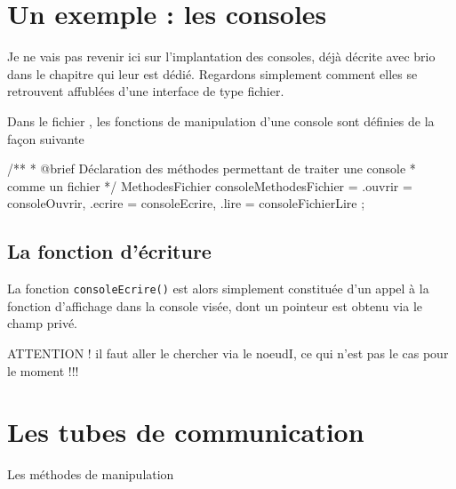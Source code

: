 %
\section{Un exemple : les consoles}

   Je ne vais pas revenir ici sur l'implantation des consoles, déjà
décrite avec brio dans le chapitre qui leur est dédié. Regardons
simplement comment elles se retrouvent affublées d'une interface de
type fichier.

   Dans le fichier , les fonctions de
manipulation d'une console sont définies de la façon suivante

\begin{lstinline}
/**
 * @brief Déclaration des méthodes permettant de traiter une console
 * comme un fichier
 */
MethodesFichier consoleMethodesFichier = {
   .ouvrir = consoleOuvrir,
   .ecrire = consoleEcrire,
   .lire = consoleFichierLire
};
\end{lstinline}

%
\subsection{La fonction d'écriture}

   La fonction \lstinline!consoleEcrire()! est alors simplement
constituée d'un appel à la fonction d'affichage dans la console visée,
dont un pointeur est obtenu via le champ privé.

   ATTENTION ! il faut aller le chercher via le noeudI, ce qui n'est
   pas le cas pour le moment !!!
   
%
\section{Les tubes de communication}

Les méthodes de manipulation
